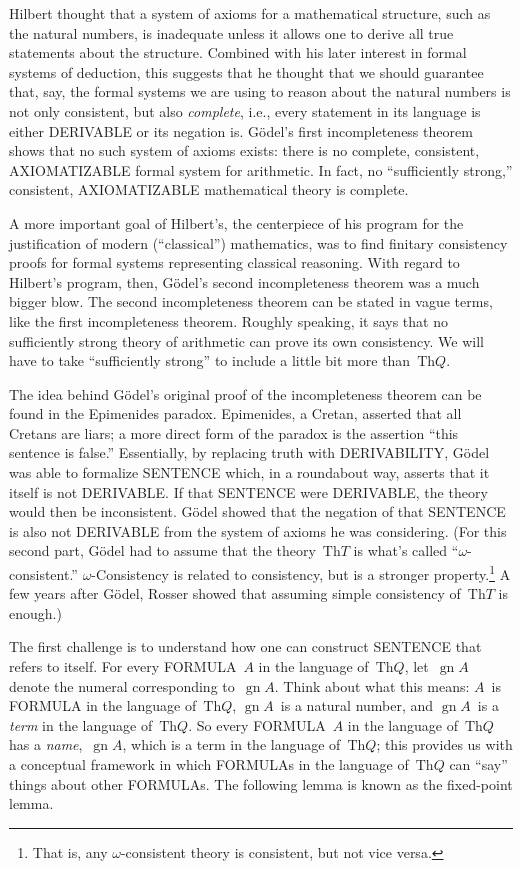 \documentclass[10pt,a4paper]{article}
\newcommand*{\olup}[1]{\MakeUppercase{#1}}
\theoremstyle{plain}
\theoremstyle{definition}
\theoremstyle{remark}
\providecommand{\Th}{\ensuremath{\mathrm{Th}}}
\providecommand{\Gn}{\operatorname{gn}}
\providecommand{\gn}{\operatorname{gn}}
\begin{document}
Hilbert thought that a system of axioms for a mathematical structure,
such as the natural numbers, is inadequate unless it allows one to
derive all true statements about the structure. Combined with his
later interest in formal systems of deduction, this suggests that he
thought that we should guarantee that, say, the formal systems we are
using to reason about the natural numbers is not only consistent, but
also \emph{complete}, i.e., every statement in its language is either
\olup{derivable} or its negation is. G\"odel's first incompleteness theorem
shows that no such system of axioms exists: there is no complete,
consistent, \olup{axiomatizable} formal system for arithmetic.  In fact,
no ``sufficiently strong,'' consistent, \olup{axiomatizable} mathematical
theory is complete.

A more important goal of Hilbert's, the centerpiece of his program for
the justification of modern (``classical'') mathematics, was to find
finitary consistency proofs for formal systems representing classical
reasoning.  With regard to Hilbert's program, then, G\"odel's second
incompleteness theorem was a much bigger blow. The second
incompleteness theorem can be stated in vague terms, like the first
incompleteness theorem. Roughly speaking, it says that no sufficiently
strong theory of arithmetic can prove its own consistency. We will
have to take ``sufficiently strong'' to include a little bit more
than~$\Th{Q}$.

The idea behind G\"odel's original proof of the incompleteness theorem
can be found in the Epimenides paradox. Epimenides, a Cretan, asserted
that all Cretans are liars; a more direct form of the paradox is the
assertion ``this sentence is false.'' Essentially, by replacing truth
with \olup{derivability}, G\"odel was able to formalize \olup{sentence}
which, in a roundabout way, asserts that it itself is not
\olup{derivable}.  If that \olup{sentence} were \olup{derivable}, the theory
would then be inconsistent.  G\"odel showed that the negation of that
\olup{sentence} is also not \olup{derivable} from the system of axioms he was
considering. (For this second part, G\"odel had to assume that the
theory~$\Th{T}$ is what's called ``$\omega$-consistent.''
$\omega$-Consistency is related to consistency, but is a stronger
property.\footnote{That is, any $\omega$-consistent theory is
consistent, but not vice versa.} A few years after G\"odel, Rosser
showed that assuming simple consistency of~$\Th{T}$ is enough.)

The first challenge is to understand how one can construct \olup{sentence}
that refers to itself. For every \olup{formula}~$A$ in the language
of~$\Th{Q}$, let~$\gn{A}$ denote the numeral corresponding
to~$\Gn{A}$. Think about what this means: $A$~is \olup{formula} in the
language of~$\Th{Q}$, $\Gn{A}$~is a natural number, and $\gn{A}$~is
a \emph{term} in the language of~$\Th{Q}$. So every \olup{formula}~$A$
in the language of~$\Th{Q}$ has a \emph{name},~$\gn{A}$, which is a
term in the language of~$\Th{Q}$; this provides us with a conceptual
framework in which \olup{formula}s in the language of~$\Th{Q}$ can ``say''
things about other \olup{formula}s. The following lemma is known as the
fixed-point lemma.
\end{document}
